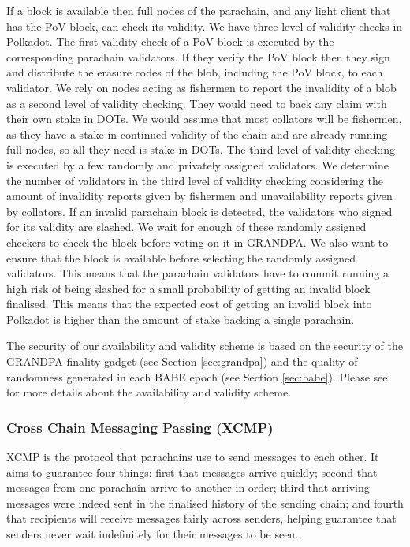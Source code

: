 \documentclass{article}
\begin{document}
If a block is available then full nodes of the parachain, and any light client that has the PoV block, can check its validity. We have three-level of validity checks in Polkadot. The first validity check of a PoV block is executed by the corresponding parachain validators. If they verify the PoV block then they sign and distribute the erasure codes of the blob, including the PoV block, to each validator.
We rely on nodes acting as fishermen to report the invalidity of a blob as  a second level of validity checking. They would need to back any claim with their own stake in DOTs. We would assume that most collators will be fishermen, as they have a stake in continued validity of the chain and are already running full nodes, so all they need is stake in DOTs. The third level of validity checking is executed by a few randomly and privately assigned validators. We determine the number of validators in the third level of validity checking considering the amount of invalidity reports given by fishermen and unavailability reports given by  collators. If an invalid parachain block is detected, the validators who signed for its validity are slashed.
We wait for enough of these randomly assigned checkers to check the block before voting on it in GRANDPA. We also  want to ensure that the block is available before selecting the randomly assigned validators. This means that the parachain validators have to commit running a high risk of being slashed for a small probability of getting an invalid block finalised. This means that the expected cost of getting an invalid block into Polkadot is higher than the amount of stake backing a single parachain.

The security of our availability and validity scheme is based on the security of the GRANDPA finality gadget (see Section \ref{sec:grandpa}) and the quality of randomness generated in each BABE epoch (see Section \ref{sec:babe}). Please see \cite{availandvalid} for more details about the availability and validity scheme.


\subsubsection{Cross Chain Messaging Passing (XCMP)} \label{sec:XCMP}
XCMP is the protocol that parachains use to send messages to each other.
It aims to guarantee four things: first that messages arrive quickly; second that messages from one parachain arrive to another in order; third that arriving messages were indeed sent in the finalised history of the sending chain; and fourth that recipients will receive messages fairly across senders, helping guarantee that senders never wait indefinitely for their messages to be seen.
\end{document}
